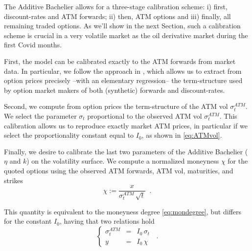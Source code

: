 \documentclass[12pt]{article}
\theoremstyle{definition}
\theoremstyle{remark}
\numberwithin{theorem}{section}
\numberwithin{proposition}{section}
\numberwithin{lemma}{section}
\numberwithin{corollary}{section}
\numberwithin{definition}{section}
\numberwithin{remark}{section}
\numberwithin{example}{section}
\begin{document}
The Additive Bachelier allows for a three-stage calibration scheme:
i) first, discount-rates and ATM forwards; ii) then, ATM options and iii) finally, all remaining traded options.
As we'll show in the next Section, such a calibration scheme is crucial in a very volatile market as the
oil derivative market during the first Covid months.

\bigskip

First, the model can be calibrated exactly to the ATM forwards from market data.
In particular, we follow the approach in \citet{azzone2021synthetic}, which allows us to extract from option prices 
precisely --with an elementary regression-- the term-structure used by option market makers of both (synthetic) forwards and
discount-rates. 

\smallskip

Second, we compute from option prices the term-structure of the ATM vol $\sigma^{ATM}_t$.
We select the parameter 
$\sigma_t$ proportional to the observed ATM vol $\sigma^{ATM}_t$.
This calibration allows us to reproduce exactly market ATM prices, in particular if we select the 
proportionality constant equal to $I_0$, as shown 
in \eqref{eq:ATMvol}.

\smallskip
Finally, we desire to calibrate the last two parameters of the Additive Bachelier ($\eta$ and $k$) on the volatility surface.
We compute a normalized  moneyness ${\chi}$ for the quoted options using the 
observed ATM forwards, ATM vol, maturities, and strikes %
\begin{equation}
\label{eq:mon_norm_k}
{\chi} :=  \frac{x}{\sigma^{ATM}_t \,\sqrt{t} }  \;\; .    
\end{equation}

This quantity is equivalent to the moneyness degree \eqref{eq:mondegree},
but differs for the constant ${ I}_0$, having that two relations hold
\[
\left\{
\begin{array}{lcl}
\sigma^{ATM}_t &=& { I}_0  \, \sigma_t \\
y &=& { I}_0  \,  {\chi}
\end{array} 
\right. \;\; .
\]
\end{document}
